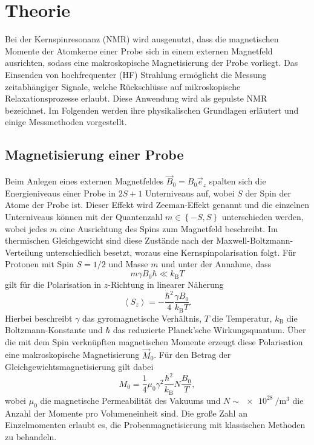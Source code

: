 \section{Theorie}
Bei der Kernspinresonanz (NMR) wird ausgenutzt, dass die magnetischen Momente der Atomkerne einer Probe sich in einem externen Magnetfeld ausrichten, sodass eine makroskopische Magnetisierung der Probe vorliegt. Das Einsenden von hochfrequenter (HF) Strahlung ermöglicht die Messung zeitabhängiger Signale, welche Rückschlüsse auf mikroskopische Relaxationsprozesse erlaubt. Diese Anwendung wird als gepulste NMR bezeichnet. Im Folgenden werden ihre physikalischen Grundlagen erläutert und einige Messmethoden vorgestellt.

\subsection{Magnetisierung einer Probe}
Beim Anlegen eines externen Magnetfeldes $\vec{B}_0 = B_0 \vec{e}_z$ spalten sich die Energieniveaus einer Probe in $2S + 1$ Unterniveaus auf, wobei $S$ der Spin der Atome der Probe ist. Dieser Effekt wird Zeeman-Effekt genannt und die einzelnen Unterniveaus können mit der Quantenzahl $m \in \left\{ -S,S \right\}$ unterschieden werden, wobei jedes $m$ eine Ausrichtung des Spins zum Magnetfeld beschreibt. Im thermischen Gleichgewicht sind diese Zustände nach der Maxwell-Boltzmann-Verteilung unterschiedlich besetzt, woraus eine Kernspinpolarisation folgt. Für Protonen mit Spin $S = 1/2$ und Masse $m$ und unter der Annahme, dass
\begin{equation*}
  m \gamma B_0 \hbar \ll k_\mathrm{B} T
\end{equation*}
gilt für die Polarisation in $z$-Richtung in linearer Näherung
\begin{equation*}
  \left< S_z \right> = - \frac{\hbar^2}{4}\frac{\gamma B_0}{k_\text{B} T}.
\end{equation*}
Hierbei beschreibt $\gamma$ das gyromagnetische Verhältnis, $T$ die Temperatur, $k_\mathrm{B}$ die Boltzmann-Konstante und $\hbar$ das reduzierte Planck'sche Wirkungsquantum. Über die mit dem Spin verknüpften magnetischen Momente erzeugt diese Polarisation eine makroskopische Magnetisierung $\vec{M}_0$. Für den Betrag der Gleichgewichtsmagnetisierung gilt dabei
\begin{equation*}
  M_0 = \frac{1}{4} \mu_0 \gamma^2 \frac{\hbar^2}{k_\mathrm{B}} N \frac{B_0}{T},
\end{equation*}
wobei $\mu_0$ die magnetische Permeabilität des Vakuums und $N \sim \SI{e28}{\per\cubic\metre}$ die Anzahl der Momente pro Volumeneinheit sind. Die große Zahl an Einzelmomenten erlaubt es, die Probenmagnetisierung mit klassischen Methoden zu behandeln.

